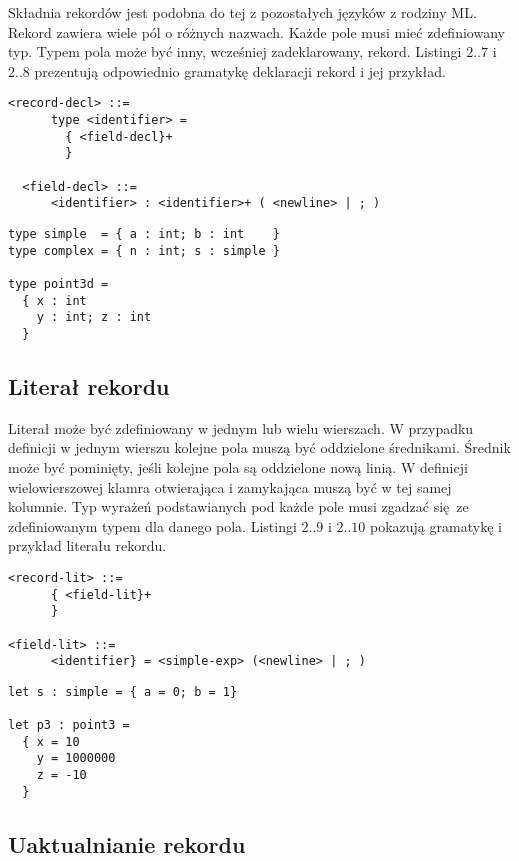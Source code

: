 \documentclass[declaration,shortabstract]{iithesis}
\begin{document}
Składnia rekordów jest podobna do tej z pozostałych języków z rodziny ML. 
Rekord zawiera wiele pól o różnych nazwach. Każde pole musi mieć zdefiniowany 
typ. Typem pola może być inny, wcześniej zadeklarowany, rekord.
Listingi $2..7$ i $2..8$ prezentują odpowiednio gramatykę deklaracji rekord
i jej przykład.

\begin{lstlisting}[frame=single, caption=Deklaracja rekordu.]
  <record-decl> ::=
      type <identifier> =
        { <field-decl}+ 
        }
  
  <field-decl> ::=
      <identifier> : <identifier>+ ( <newline> | ; )
\end{lstlisting}

\begin{lstlisting}[frame=single, caption=Definicja rekordu.]
type simple  = { a : int; b : int    }
type complex = { n : int; s : simple }

type point3d = 
  { x : int 
    y : int; z : int 
  }
\end{lstlisting}

\subsection{Literał rekordu}

Literał może być zdefiniowany w jednym lub wielu wierszach. W przypadku 
definicji w jednym wierszu kolejne pola muszą być oddzielone średnikami. 
Średnik może być pominięty, jeśli kolejne pola są oddzielone nową linią. 
W definicji wielowierszowej klamra otwierająca i zamykająca muszą być w tej 
samej kolumnie. Typ wyrażeń podstawianych pod każde pole musi zgadzać się ze 
zdefiniowanym typem dla danego pola. Listingi $2..9$ i $2..10$ pokazują 
gramatykę i przykład literału rekordu.

\begin{lstlisting}[frame=single, caption=Literał rekordu.]
<record-lit> ::=
      { <field-lit}+
      }

<field-lit> ::=
      <identifier} = <simple-exp> (<newline> | ; )
\end{lstlisting}

\begin{lstlisting}[frame=single, caption=Literał rekordu.]
let s : simple = { a = 0; b = 1}

let p3 : point3 = 
  { x = 10
    y = 1000000 
    z = -10 
  }
\end{lstlisting}

\subsection{Uaktualnianie rekordu}
\end{document}

